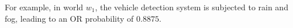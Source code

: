 For example, in world $w_1$, the vehicle detection system is subjected to rain and fog, leading to an OR probability of $0.8875$.









  
  
  
